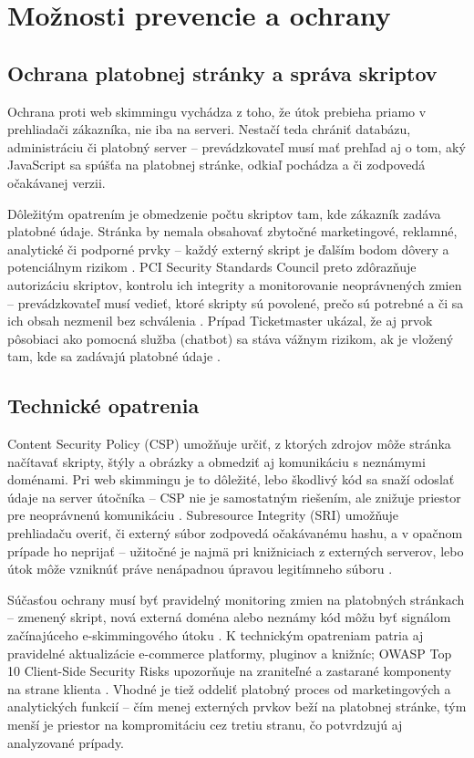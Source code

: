 \section{Možnosti prevencie a ochrany}

\subsection{Ochrana platobnej stránky a správa skriptov}

Ochrana proti web skimmingu vychádza z toho, že útok prebieha priamo v prehliadači zákazníka, nie iba na serveri. Nestačí teda chrániť databázu, administráciu či platobný server -- prevádzkovateľ musí mať prehľad aj o tom, aký JavaScript sa spúšťa na platobnej stránke, odkiaľ pochádza a či zodpovedá očakávanej verzii.

Dôležitým opatrením je obmedzenie počtu skriptov tam, kde zákazník zadáva platobné údaje. Stránka by nemala obsahovať zbytočné marketingové, reklamné, analytické či podporné prvky -- každý externý skript je ďalším bodom dôvery a potenciálnym rizikom \cite{owaspThirdPartyJavascript}. PCI Security Standards Council preto zdôrazňuje autorizáciu skriptov, kontrolu ich integrity a monitorovanie neoprávnených zmien -- prevádzkovateľ musí vedieť, ktoré skripty sú povolené, prečo sú potrebné a či sa ich obsah nezmenil bez schválenia \cite{pciSsc2025PaymentPage}. Prípad Ticketmaster ukázal, že aj prvok pôsobiaci ako pomocná služba (chatbot) sa stáva vážnym rizikom, ak je vložený tam, kde sa zadávajú platobné údaje \cite{ico2020Ticketmaster}.

\subsection{Technické opatrenia}

Content Security Policy (CSP) umožňuje určiť, z ktorých zdrojov môže stránka načítavať skripty, štýly a obrázky a obmedziť aj komunikáciu s neznámymi doménami. Pri web skimmingu je to dôležité, lebo škodlivý kód sa snaží odoslať údaje na server útočníka -- CSP nie je samostatným riešením, ale znižuje priestor pre neoprávnenú komunikáciu \cite{owaspThirdPartyJavascript,owaspClientSideTop10}. Subresource Integrity (SRI) umožňuje prehliadaču overiť, či externý súbor zodpovedá očakávanému hashu, a v opačnom prípade ho neprijať -- užitočné je najmä pri knižniciach z externých serverov, lebo útok môže vzniknúť práve nenápadnou úpravou legitímneho súboru \cite{owaspSRI}.

Súčasťou ochrany musí byť pravidelný monitoring zmien na platobných stránkach -- zmenený skript, nová externá doména alebo neznámy kód môžu byť signálom začínajúceho e-skimmingového útoku \cite{pciSsc2025PaymentPage}. K technickým opatreniam patria aj pravidelné aktualizácie e-commerce platformy, pluginov a knižníc; OWASP Top 10 Client-Side Security Risks upozorňuje na zraniteľné a zastarané komponenty na strane klienta \cite{owaspClientSideTop10}. Vhodné je tiež oddeliť platobný proces od marketingových a analytických funkcií -- čím menej externých prvkov beží na platobnej stránke, tým menší je priestor na kompromitáciu cez tretiu stranu, čo potvrdzujú aj analyzované prípady.

